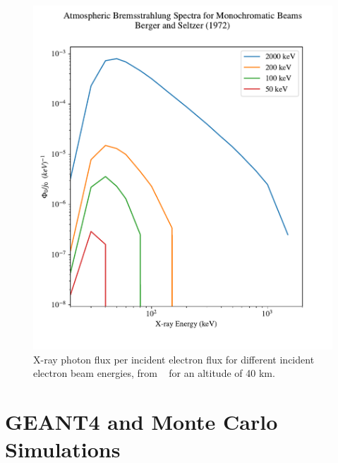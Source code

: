 \begin{figure}[p]
\label{berger_seltzer_curves_2}
\centering
\includegraphics[width=1.0\textwidth]{figures/chapter_3/berger-seltzer-curves/berger_seltzer_curves_3}
\caption{X-ray photon flux per incident electron flux for different incident electron beam energies, from ~\cite{Berger1972} for an altitude of 40 km. }
\end{figure}

\section{GEANT4 and Monte Carlo Simulations}

